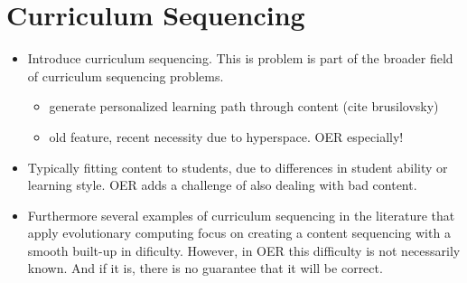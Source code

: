 \section{Curriculum Sequencing}
\label{sec:task_curr_seq}
\begin{itemize}
	\item Introduce curriculum sequencing. This is problem is part of the
		broader field of curriculum sequencing problems.
		\begin{itemize}
			\item generate personalized learning path through content (cite
				brusilovsky)
			\item old feature, recent necessity due to hyperspace. OER
				especially!
		\end{itemize}
	\item Typically fitting content to students, due to differences in student
		ability or learning style. OER adds a challenge of also dealing with
		bad content.
	\item Furthermore several examples of curriculum sequencing in the
		literature that apply evolutionary computing focus on creating a
		content sequencing with a smooth built-up in dificulty. However, in OER
		this difficulty is not necessarily known. And if it is, there is no
		guarantee that it will be correct.
\end{itemize}

